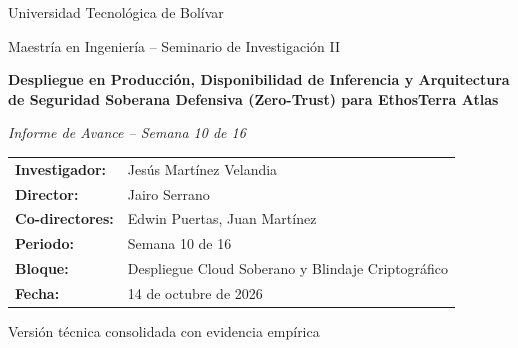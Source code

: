 \documentclass[11pt,a4paper]{article}
\begin{document}
\begin{titlepage}
    \thispagestyle{empty}
    \centering
    \vspace*{1.5cm}

    {\large Universidad Tecnol\'ogica de Bol\'ivar\par}
    \vspace{0.3cm}
    {\normalsize Maestr\'ia en Ingenier\'ia -- Seminario de Investigaci\'on II\par}

    \vspace{2.0cm}
    {\LARGE\bfseries Despliegue en Producci\'on, Disponibilidad de Inferencia y Arquitectura de Seguridad Soberana Defensiva (Zero-Trust) para EthosTerra Atlas\par}

    \vspace{0.8cm}
    {\large\itshape Informe de Avance -- Semana 10 de 16\par}

    \vspace{2.2cm}
    \begin{tabular}{ll}
        \textbf{Investigador:} & Jes\'us Mart\'inez Velandia \\
        \textbf{Director:} & Jairo Serrano \\
        \textbf{Co-directores:} & Edwin Puertas, Juan Mart\'inez \\
        \textbf{Periodo:} & Semana 10 de 16 \\
        \textbf{Bloque:} & Despliegue Cloud Soberano y Blindaje Criptogr\'afico \\
        \textbf{Fecha:} & 14 de octubre de 2026 \\
    \end{tabular}

    \vfill
    {\small Versi\'on t\'ecnica consolidada con evidencia emp\'irica\par}
    \vspace*{1.0cm}
\end{titlepage}

\newpage
{}
\fancyfoot[C]{\small \thepage}
\tableofcontents
\newpage

\setcounter{page}{1}
\end{document}
